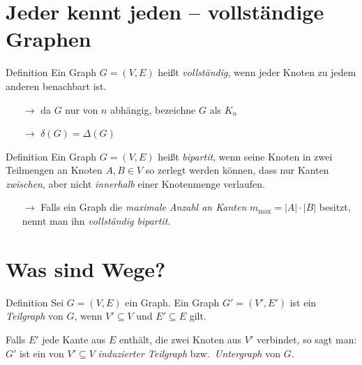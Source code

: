 \documentclass{beamer}
\begin{document}
\section[Jeder kennt jeden]{Jeder kennt jeden -- vollständige Graphen}

\begin{frame}{\secname}
	\begin{block}{Definition}
		Ein Graph $G = (V, E)$ heißt \emph{vollständig}, wenn jeder Knoten zu jedem anderen benachbart ist.
		\begin{itemize}
			\item[$\rightarrow$] da $G$ nur von $n$ abhängig, bezeichne $G$ als $K_n$
			\item[$\rightarrow$] $\delta(G) = \Delta(G)$
		\end{itemize}
	\end{block}

\end{frame}

\begin{frame}
	\begin{block}{Definition}
		Ein Graph $G = (V, E)$ heißt \emph{bipartit}, wenn seine Knoten in zwei Teilmengen an Knoten $A, B \in V$ so zerlegt werden können, dass nur Kanten \emph{zwischen}, aber nicht \emph{innerhalb} einer Knotenmenge verlaufen.
		\begin{itemize}
			\item[$\rightarrow$] Falls ein Graph die \emph{maximale Anzahl an Kanten} $m_{\mathrm{max}} = |A| \cdot |B|$ besitzt, nennt man ihn \emph{vollständig bipartit}.
		\end{itemize}
	\end{block}
\end{frame}

\section{Was sind Wege?}

\begin{frame}{\secname}
	\begin{block}{Definition}
		Sei $G = (V, E)$ ein Graph. Ein Graph $G' = (V', E')$ ist ein \emph{Teilgraph} von $G$, wenn $V' \subseteq V$ und $E' \subseteq E$ gilt.
		\par\bigskip
    Falls $E'$ jede Kante aus $E$ enthält, die zwei Knoten aus $V'$ verbindet, so sagt man: $G'$ ist ein von $V' \subseteq V$ \emph{induzierter Teilgraph} bzw.\ \emph{Untergraph} von $G$.
	\end{block}
\end{frame}
\end{document}
